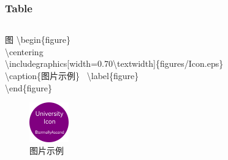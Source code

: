 \begin{frame}
    \frametitle{Table}
    \begin{columns}
        \begin{column}{0.94\textwidth}
            \begin{block}{图}
                \textbackslash begin\{figure\}\\
                \quad \textbackslash centering\\
                    \quad \textbackslash includegraphics[width=0.70\textbackslash textwidth]\{figures/Icon.eps\}\\
                    \quad \textbackslash caption\{图片示例\}
                    \, \textbackslash label\{figure\}\\
                \textbackslash end\{figure\}
            \end{block}
            \begin{figure}
                \centering
                \includegraphics[width=0.16\textwidth]{figures/Icon.eps}
                \caption{图片示例}\label{figure}
            \end{figure}
        \end{column}
        \begin{column}{0.06\textwidth}
        \end{column}
    \end{columns}
\end{frame}

